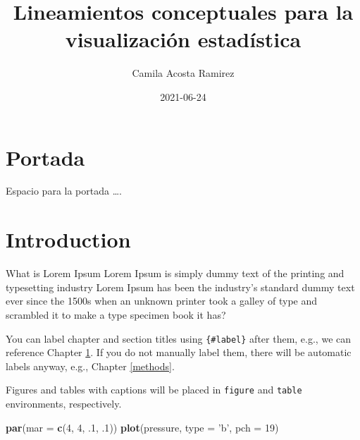 \documentclass[
]{book}
\title{Lineamientos conceptuales para la visualización estadística}
\author{Camila Acosta Ramirez}
\date{2021-06-24}
\newenvironment{Shaded}{\begin{snugshade}}{\end{snugshade}}
\newcommand{\DataTypeTok}[1]{\textcolor[rgb]{0.13,0.29,0.53}{#1}}
\newcommand{\DecValTok}[1]{\textcolor[rgb]{0.00,0.00,0.81}{#1}}
\newcommand{\FloatTok}[1]{\textcolor[rgb]{0.00,0.00,0.81}{#1}}
\newcommand{\KeywordTok}[1]{\textcolor[rgb]{0.13,0.29,0.53}{\textbf{#1}}}
\newcommand{\NormalTok}[1]{#1}
\newcommand{\StringTok}[1]{\textcolor[rgb]{0.31,0.60,0.02}{#1}}
\begin{document}
\maketitle

{
\setcounter{tocdepth}{1}
\tableofcontents
}
\hypertarget{portada}{%
\chapter*{Portada}\label{portada}}

Espacio para la portada \ldots.

\hypertarget{intro}{%
\chapter{Introduction}\label{intro}}

What is Lorem Ipsum Lorem Ipsum is simply dummy text of the printing and typesetting industry Lorem Ipsum has been the industry's standard dummy text ever since the 1500s when an unknown printer took a galley of type and scrambled it to make a type specimen book it has?

You can label chapter and section titles using \texttt{\{\#label\}} after them, e.g., we can reference Chapter \ref{intro}. If you do not manually label them, there will be automatic labels anyway, e.g., Chapter \ref{methods}.

Figures and tables with captions will be placed in \texttt{figure} and \texttt{table} environments, respectively.

\begin{Shaded}
\begin{Highlighting}[]
\KeywordTok{par}\NormalTok{(}\DataTypeTok{mar =} \KeywordTok{c}\NormalTok{(}\DecValTok{4}\NormalTok{, }\DecValTok{4}\NormalTok{, }\FloatTok{.1}\NormalTok{, }\FloatTok{.1}\NormalTok{))}
\KeywordTok{plot}\NormalTok{(pressure, }\DataTypeTok{type =} \StringTok{'b'}\NormalTok{, }\DataTypeTok{pch =} \DecValTok{19}\NormalTok{)}
\end{Highlighting}
\end{Shaded}
\end{document}

